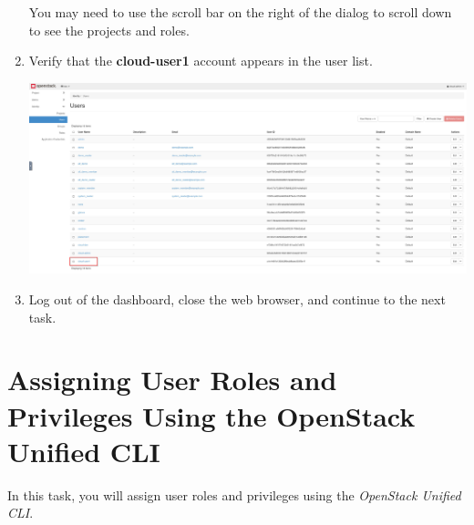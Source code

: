 \documentclass[letterpaper, 12pt]{article}
\begin{document}
\begin{enumerate}
    \begin{tipbox}
        You may need to use the scroll bar on the right of the dialog to scroll down to see the projects and roles.
    \end{tipbox}

    \item Verify that the \textbf{cloud-user1} account appears in the user list.
    
    \begin{center}
        \includegraphics[width=\linewidth]{images/part5/step6.png}
    \end{center}

    \item Log out of the dashboard, close the web browser, and continue to the next task.
\end{enumerate}

\section{Assigning User Roles and Privileges Using the OpenStack Unified CLI}
\label{sec:assigning_user_roles_and_privileges_using_the_openstack_unified_cli}
In this task, you will assign user roles and privileges using the \textit{OpenStack Unified CLI}.
\end{document}
